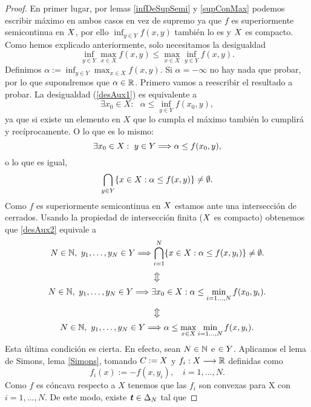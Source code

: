 \begin{proof}
En primer lugar, por lemas \ref{infDeSupSemi} y \ref{supConMax}  podemos escribir máximo en ambos casos en vez de supremo ya que $ f $ es superiormente semicontinua en $ X $, por ello $ \inf_{y \in Y} f(x,y) $ también lo es y $ X $ es compacto. Como hemos explicado anteriormente, solo necesitamos la desigualdad 
\begin{equation}\label{desAux1}
\inf_{y \in Y} \max_{x \in X} f(x,y) \leq \max_{x \in X} \inf_{y \in Y} f(x,y).
\end{equation}  Definimos $ \alpha := \inf_{y \in Y} \max_{x \in X} f(x,y) $. Si $ \alpha = -\infty $ no hay nada que probar, por lo que supondremos que $ \alpha \in \mathbb{R} $. Primero vamos a reescribir el resultado a probar. La desigualdad (\ref{desAux1}) es equivalente a
\[
\exists x_0 \in X:\text{ }\alpha \leq \inf_{y \in Y} f(x_0,y),
\]
ya que si existe un elemento en $ X $ que lo cumpla el máximo también lo cumplirá y recíprocamente. O lo que es lo mismo:
\[
\exists x_0 \in X:\text{ }y \in Y \Longrightarrow \alpha \leq f(x_0,y),
\]
o lo que es igual, 
\begin{equation}\label{desAux2}
\bigcap_{y\in Y}\{x \in X: \alpha \leq f(x, y) \} \neq \emptyset.
\end{equation}
Como $ f $ es superiormente semicontinua en $ X $ estamos ante una intersección de cerrados. Usando la propiedad de intersección finita ($ X $ es compacto) obtenemos que \eqref{desAux2} equivale a
\[
N\in\mathbb{N}, \text{ }y_1,\dots,y_N \in Y \Longrightarrow \bigcap_{i=1}^{N}\{x \in X: \alpha \leq f(x, y_i) \} \neq \emptyset.
\]
\[
\big\Updownarrow
\]
\[
N\in\mathbb{N}, \text{ }y_1,\dots,y_N \in Y \Longrightarrow \exists x_0\in X:\alpha \leq \min_{i=1\dots,N }f(x_0,y_i).
\]
\[
\big\Updownarrow
\]
\begin{equation}\label{desAux}
N\in\mathbb{N}, \text{ }y_1,\dots,y_N \in Y \Longrightarrow \alpha \leq \max_{x \in X} \min_{i=1\dots,N }f(x,y_i).
\end{equation}
Esta última condición es cierta. En efecto, sean $ N \in \mathbb{N} $ e $ \in Y$. Aplicamos el lema de Simons, lema \ref{Simons}, tomando $ C := X $ y $ f_i: X \longrightarrow \mathbb{R} $ definidas como \[
 f_i(x):=-f(x,y_i), \quad i=1,\dots,N.\]
Como $ f $ es cóncava respecto a $ X $ tenemos que las $ f_i $ son convexas para X con $  i=1,\dots,N $. De este modo, existe $ \textbf{\emph{t}} \in \Delta_N$ tal que

\end{proof}
